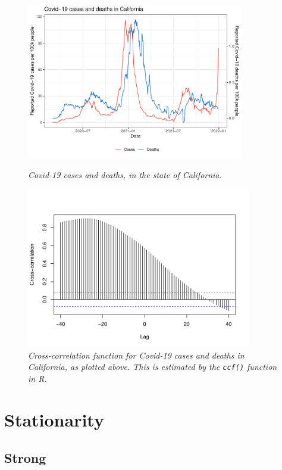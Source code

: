 \documentclass{article}
\begin{document}
\begin{figure}[p]
\centering
\includegraphics[width=0.85\textwidth]{fig/covid-1.pdf}
\caption{\it Covid-19 cases and deaths, in the state of California.}
\label{fig:covid}

\includegraphics[width=0.875\textwidth]{fig/covid-2.pdf}
\caption{\it Cross-correlation function for Covid-19 cases and deaths in
  California, as plotted above. This is estimated by the \texttt{ccf()} function
  in R.}   
\label{fig:covid}
\end{figure}

\section{Stationarity}
\def\eqd{\overset{d}{=}}

\subsection{Strong}
\end{document}
